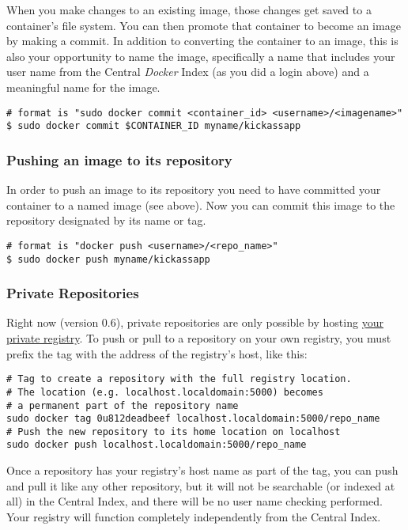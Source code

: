 \documentclass[11pt]{article}
\begin{document}
When you make changes to an existing image, those changes get saved to a container’s file system. You can then promote that container to become an image by making a commit. In addition to converting the container to an image, this is also your opportunity to name the image, specifically a name that includes your user name from the Central \emph{Docker} Index (as you did a login above) and a meaningful name for the image.

\begin{verbatim}
# format is "sudo docker commit <container_id> <username>/<imagename>"
$ sudo docker commit $CONTAINER_ID myname/kickassapp
\end{verbatim}
\subsubsection{Pushing an image to its repository}
\label{sec-2-3-9}

In order to push an image to its repository you need to have committed your container to a named image (see above).
Now you can commit this image to the repository designated by its name or tag.

\begin{verbatim}
# format is "docker push <username>/<repo_name>"
$ sudo docker push myname/kickassapp
\end{verbatim}
\subsubsection{Private Repositories}
\label{sec-2-3-10}

Right now (version 0.6), private repositories are only possible by hosting \href{https://github.com/dotcloud/docker-registry}{your private registry}. To push or pull to a repository on your own registry, you must prefix the tag with the address of the registry’s host, like this:

\begin{verbatim}
# Tag to create a repository with the full registry location.
# The location (e.g. localhost.localdomain:5000) becomes
# a permanent part of the repository name
sudo docker tag 0u812deadbeef localhost.localdomain:5000/repo_name
# Push the new repository to its home location on localhost
sudo docker push localhost.localdomain:5000/repo_name
\end{verbatim}
Once a repository has your registry’s host name as part of the tag, you can push and pull it like any other repository, but it will not be searchable (or indexed at all) in the Central Index, and there will be no user name checking performed. Your registry will function completely independently from the Central Index.
\end{document}
